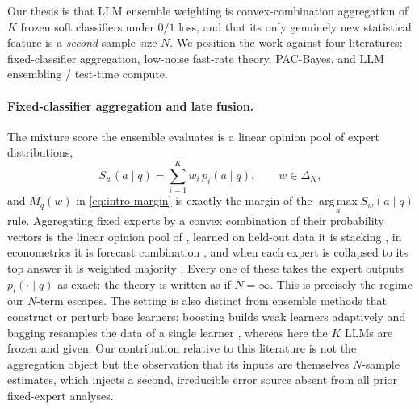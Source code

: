 \documentclass{article} %
\providecommand{\argmax}{\mathop{\mathrm{arg\,max}}\limits}
\providecommand{\simplex}{\Delta_K}
\begin{document}
Our thesis is that LLM ensemble weighting is convex-combination aggregation of
$K$ frozen soft classifiers under $0/1$ loss, and that its only genuinely new
statistical feature is a \emph{second} sample size $N$. We position the work
against four literatures: fixed-classifier aggregation, low-noise fast-rate
theory, PAC-Bayes, and LLM ensembling / test-time compute.

\paragraph{Fixed-classifier aggregation and late fusion.}
The mixture score the ensemble evaluates is a linear opinion pool of expert
distributions,
\begin{equation}
\label{eq:rw-pool}
S_w(a\mid q) = \sum_{i=1}^K w_i\, p_i(a\mid q), \qquad w\in\simplex,
\end{equation}
and $M_q(w)$ in \eqref{eq:intro-margin} is exactly the margin of the
$\argmax_a S_w(a\mid q)$ rule. Aggregating fixed experts by a convex combination
of their probability vectors is the linear opinion pool of
\citet{stone1961opinionpool,genest1986combining}, learned on held-out data it is
stacking \citep{wolpert1992stacked,breiman1996stacked}, in econometrics it is
forecast combination \citep{bates1969combination}, and when each expert is
collapsed to its top answer it is weighted majority
\citep{littlestone1994weighted}. Every one of these takes the expert outputs
$p_i(\cdot\mid q)$ as exact: the theory is written as if $N=\infty$. This is
precisely the regime our $N$-term escapes. The setting is also distinct from
ensemble methods that construct or perturb base learners: boosting builds weak
learners adaptively \citep{schapire1997boostingtm,freund1997adg} and bagging
resamples the data of a single learner \citep{breiman1996baggingp}, whereas here
the $K$ LLMs are frozen and given. Our contribution relative to this literature
is not the aggregation object but the observation that its inputs are themselves
$N$-sample estimates, which injects a second, irreducible error source absent
from all prior fixed-expert analyses.
\end{document}
